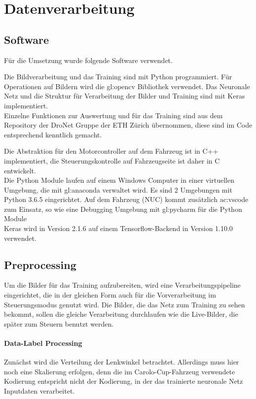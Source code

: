 \section{Datenverarbeitung}

\subsection{Software}
Für die Umsetzung wurde folgende Software verwendet.

Die Bildverarbeitung und das Training sind mit Python programmiert. Für Operationen auf Bildern wird die \gls{gl:opencv} Bibliothek verwendet. Das Neuronale Netz und die Struktur für Verarbeitung der Bilder und Training sind mit Keras implementiert.\\
Einzelne Funktionen zur Auswertung und für das Training sind aus dem Repository der DroNet Gruppe der ETH Zürich übernommen, diese sind im Code entsprechend kenntlich gemacht.

Die Abstraktion für den Motorcontroller auf dem Fahrzeug ist in C++ implementiert, die Steuerungskontrolle auf Fahrzeugseite ist daher in C entwickelt.\\
Die Python Module laufen auf einem Windows Computer in einer virtuellen Umgebung, die mit \gls{gl:anaconda} verwaltet wird. Es sind 2 Umgebungen mit Python 3.6.5 eingerichtet. Auf dem Fahrzeug (NUC) kommt zusätzlich \gls{ac:vscode} zum Einsatz, so wie eine Debugging Umgebung mit \gls{gl:pycharm} für die Python Module\\
Keras wird in Version 2.1.6 auf einem Tensorflow-Backend in Version 1.10.0 verwendet.

\subsection{Preprocessing}
Um die Bilder für das Training aufzubereiten, wird eine Verarbeitungspipeline eingerichtet, die in der gleichen Form auch für die Vorverarbeitung im Steuerungsmodus genutzt wird. Die Bilder, die das Netz zum Training zu \glqq sehen \grqq{} bekommt, sollen die gleiche Verarbeitung durchlaufen wie die Live-Bilder, die später zum Steuern benutzt werden. 

\paragraph{Data-Label Processing}
Zunächst wird die Verteilung der Lenkwinkel betrachtet. Allerdings muss hier noch eine Skalierung erfolgen, denn die im Carolo-Cup-Fahrzeug verwendete Kodierung entspricht nicht der Kodierung, in der das trainierte neuronale Netz Inputdaten verarbeitet.

